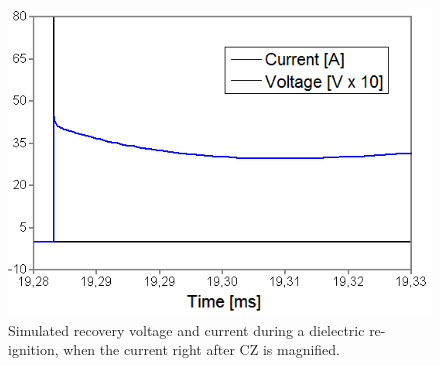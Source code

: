 \documentclass[10pt,b5paper,twoside]{article}
\begin{document}
\begin{figure}[H]
\centering
\includegraphics[scale=0.65]{Bilder/Results/ATPdraw_ZOOM_CurrentandVoltage_2_label.png}
\caption{Simulated recovery voltage and current during a dielectric re-ignition, when the current right after CZ is magnified.} \label{fig:DR_ATP_ZOOM}
\end{figure}
\newpage



\cleardoublepage
\end{document}
